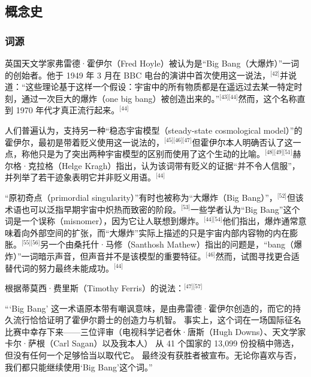 \subsection{概念史}
\subsubsection{词源}
英国天文学家弗雷德·霍伊尔（Fred Hoyle）被认为是“Big Bang（大爆炸）”一词的创始者。他于 1949 年 3 月在 BBC 电台的演讲中首次使用这一说法，\(^\text{[42]}\)并说道：“这些理论基于这样一个假设：宇宙中的所有物质都是在遥远过去某一特定时刻，通过一次巨大的爆炸（one big bang）被创造出来的。”\(^\text{[43][44]}\)然而，这个名称直到 1970 年代才真正流行起来。\(^\text{[44]}\)

人们普遍认为，支持另一种“稳态宇宙模型（steady-state cosmological model）”的霍伊尔，最初是带着贬义使用这一说法的，\(^\text{[45][46][47]}\)但霍伊尔本人明确否认了这一点，称他只是为了突出两种宇宙模型的区别而使用了这个生动的比喻。\(^\text{[48][49][51]}\)赫尔格·克拉格（Helge Kragh）指出，认为该词带有贬义的证据“并不令人信服”，并列举了若干迹象表明它并非贬义用语。\(^\text{[44]}\)

“原初奇点（primordial singularity）”有时也被称为“大爆炸（Big Bang）”，\(^\text{[52]}\)但该术语也可以泛指早期宇宙中炽热而致密的阶段。\(^\text{[53]}\)一些学者认为“Big Bang”这个词是一个误称（misnomer），因为它让人联想到爆炸。\(^\text{[44][54]}\)他们指出，爆炸通常意味着向外部空间的扩张，而“大爆炸”实际上描述的只是宇宙内部内容物的内在膨胀。\(^\text{[55][56]}\)另一个由桑托什·马修（Santhosh Mathew）指出的问题是，“bang（爆炸）”一词暗示声音，但声音并不是该模型的重要特征。\(^\text{[46]}\)然而，试图寻找更合适替代词的努力最终未能成功。\(^\text{[44]}\)

根据蒂莫西·费里斯（Timothy Ferris）的说法：\(^\text{[47][57]}\)  

“‘Big Bang’ 这一术语原本带有嘲讽意味，是由弗雷德·霍伊尔创造的，而它的持久流行恰恰证明了霍伊尔爵士的创造力与机智。  
事实上，这个词在一场国际征名比赛中幸存下来——三位评审（电视科学记者休·唐斯（Hugh Downs）、天文学家卡尔·萨根（Carl Sagan）以及我本人）  
从 41 个国家的 13,099 份投稿中筛选，但没有任何一个足够恰当以取代它。  
最终没有获胜者被宣布。无论你喜欢与否，我们都只能继续使用‘Big Bang’这个词。”
